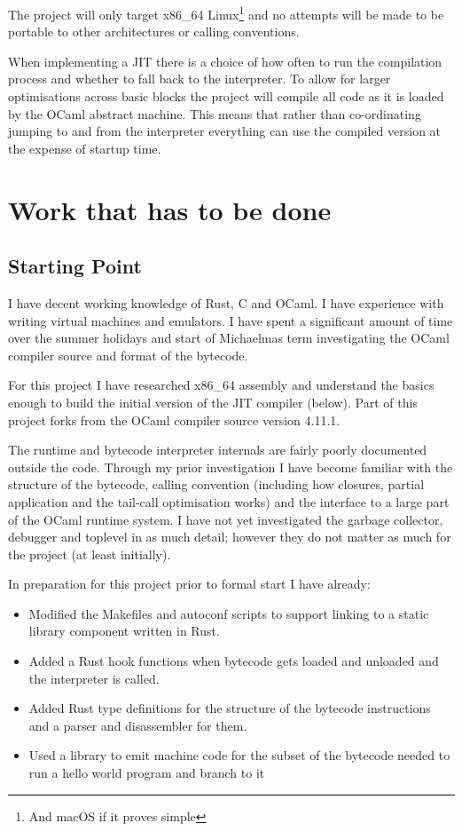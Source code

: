 \documentclass[12pt,a4paper, headings=standardclasses]{scrartcl}
\begin{document}
The project will only target x86\_64 Linux\footnote{And macOS if it proves
      simple} and no attempts will be made to be portable to other architectures or
calling conventions.

When implementing a JIT there is a choice of how often to run the compilation
process and whether to fall back to the interpreter. To allow for larger
optimisations across basic blocks the project will compile all code as it is
loaded by the OCaml abstract machine. This means that rather than
co-ordinating jumping to and from the interpreter everything can use the
compiled version at the expense of startup time.

\section*{Work that has to be done}

\subsection*{Starting Point}

I have decent working knowledge of Rust, C and OCaml. I have experience with
writing virtual machines and emulators. I have spent a significant amount of
time over the summer holidays and start of Michaelmas term investigating the
OCaml compiler source and format of the bytecode.

For this project I have researched x86\_64 assembly and understand the basics
enough to build the initial version of the JIT compiler (below). Part of this
project forks from the OCaml compiler source version 4.11.1.

The runtime and bytecode interpreter internals are fairly poorly documented
outside the code. Through my prior investigation I have become familiar
with the structure of the bytecode, calling convention (including how
closures, partial application and the tail-call optimisation works) and the
interface to a large part of the OCaml runtime system. I have not yet
investigated the garbage collector, debugger and toplevel in as much detail;
however they do not matter as much for the project (at least initially).

In preparation for this project prior to formal start I have already:

\begin{itemize}
      \item Modified the Makefiles and autoconf scripts to support linking to
            a static library component written in Rust.
      \item Added a Rust hook functions when bytecode gets loaded and unloaded
            and the interpreter is called.
      \item Added Rust type definitions for the structure of the bytecode instructions
            and a parser and disassembler for them.
      \item Used a library to emit machine code for the subset of the
            bytecode needed to run a hello world program and branch to it
\end{itemize}
\end{document}
